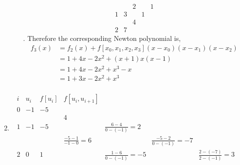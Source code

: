\documentclass{report}
\begin{document}
\begin{solution}
\begin{enumerate}[label=(\alph*)]
\begin{enumerate}[label=(\roman*)]
\[\begin{array}{c|cccc}
					               &        & 2               &                         & 1                               \\
					            1  & 3      &                 & 1                       &                                 \\
					               &        & 4               &                         &                                 \\
					            2  & 7      &                 &                         &
				            \end{array}
			            \].
			            Therefore the corresponding Newton polynomial is,
			            \begin{align*}
				            f_3(x) & = f_2(x) + f[x_0,x_1,x_2,x_3](x-x_0)(x-x_1)(x-x_2) \\
				                   & = 1 + 4x -2x^2 + (x+1)x(x-1) \\
				                   & = 1 + 4x -2x^2 + x^3 -x \\
				                   & = 1 + 3x -2x^2 + x^3 \\
			            \end{align*}
		      \end{enumerate}
		\item \[
			      \begin{array}{c|ccccccc}
				      i & u_i & f[u_i] & f[u_i, u_{i+1}]         &                       &                               &                           &                         \\
				      \hline
				      0 & -1  & -5     &                         &                       &                               &                           &                         \\
				        &     &        & 4                       &                       &                               &                           &                         \\
				      1 & -1  & -5     &                         & \frac{6-4}{0-(-1)}=2  &                               &                           &                         \\
				        &     &        & \frac{-5-1}{-1-0}= 6    &                       & \frac{-5-2}{0-(-1)} = -7      &                           &                         \\
				      2 & 0   & 1      &                         & \frac{1-6}{0-(-1)}=-5 &                               & \frac{2-(-7)}{2-(-1)}= 3  &                         \\

\end{array}\]
\end{enumerate}
\end{solution}
\end{document}
